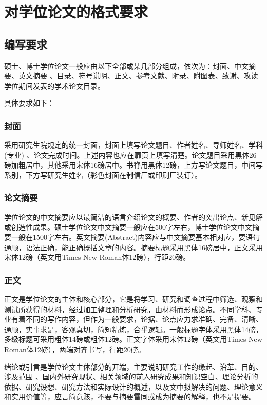\section{对学位论文的格式要求}

\subsection{编写要求}

硕士、博士学位论文一般应由以下全部或某几部分组成，依次为：封面、中文摘要、英文摘要 、目录、符号说明、正文、参考文献、附录、附图表、致谢、攻读学位期间发表的学术论文目录。

具体要求如下：

\subsubsection{封面}

采用研究生院规定的统一封面，封面上填写论文题目、作者姓名、导师姓名、学科(专业) 、论文完成时间。上述内容也应在扉页上填写清楚。论文题目采用黑体26磅加粗居中，其他采用宋体16磅居中。书脊用黑体12磅，上方写论文题目，中间写系别，下方写研究生姓名（彩色封面在制信厂或印刷厂装订）。

\subsubsection{论文摘要}

学位论文的中文摘要应以最简洁的语言介绍论文的概要、作者的突出论点、新见解或创造性成果。硕士学位论文中文摘要一般应在500字左右，博士学位论文中文摘要一般在1500字左右。英文摘要(Abstract)内容应与中文摘要基本相对应，要语句通顺，语法正确，能正确概括文章的内容。摘要标题采用黑体16磅居中，正文采用宋体12磅（英文用Times New Roman体12磅），行距20磅。

\subsubsection{正文}

正文是学位论文的主体和核心部分，它是将学习、研究和调查过程中筛选、观察和测试所获得的材料，经过加工整理和分析研究，由材料而形成论点。不同学科、专业有着不同的写作内容，但作为一般要求，论据、论点应力求准确、完备、清晰、通顺，实事求是，客观真切，简短精炼，合乎逻辑。一般标题字体采用黑体14磅，多级标题可采用粗体14磅或粗体12磅。正文字体采用宋体12磅（英文用Times New Roman体12磅），两端对齐书写，行距20磅。


绪论或引言是学位论文主体部分的开端，主要说明研究工作的缘起、沿革、目的、涉及范围 、国内外研究现状、相关领域的前人研究成果和知识空白、理论分析的依据、研究设想、研究方法和实际设计的概述，以及文中拟解决的问题、理论意义和实用价值等，应言简意赅，不要与摘要雷同或成为摘要的解释，也不是提要。

